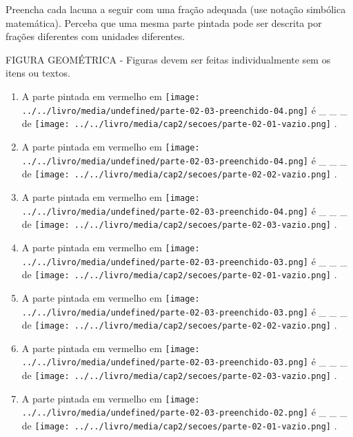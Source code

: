 \documentclass[a4,12pt]{book}
\begin{document}
Preencha cada lacuna a seguir com uma fração adequada (use notação simbólica matemática). Perceba que uma mesma parte pintada pode ser descrita por frações diferentes com unidades diferentes.
\begin{imagem*}[breakable]{}{}   FIGURA GEOMÉTRICA - Figuras devem ser feitas individualmente sem os itens ou textos.  
\end{imagem*}
\begin{enumerate} [\quad a)] %
  \item     A parte pintada em vermelho em         \texttt{[image: ../../livro/media/undefined/parte-02-03-preenchido-04.png]}     é \_ \_ \_   de         \texttt{[image: ../../livro/media/cap2/secoes/parte-02-01-vazio.png]}    .
  \item     A parte pintada em vermelho em         \texttt{[image: ../../livro/media/undefined/parte-02-03-preenchido-04.png]}     é \_ \_ \_   de         \texttt{[image: ../../livro/media/cap2/secoes/parte-02-02-vazio.png]}    .
  \item     A parte pintada em vermelho em         \texttt{[image: ../../livro/media/undefined/parte-02-03-preenchido-04.png]}     é \_ \_ \_   de         \texttt{[image: ../../livro/media/cap2/secoes/parte-02-03-vazio.png]}    .
  \item     A parte pintada em vermelho em         \texttt{[image: ../../livro/media/undefined/parte-02-03-preenchido-03.png]}     é \_ \_ \_   de         \texttt{[image: ../../livro/media/cap2/secoes/parte-02-01-vazio.png]}    .
  \item     A parte pintada em vermelho em         \texttt{[image: ../../livro/media/undefined/parte-02-03-preenchido-03.png]}     é \_ \_ \_   de         \texttt{[image: ../../livro/media/cap2/secoes/parte-02-02-vazio.png]}    .
  \item     A parte pintada em vermelho em         \texttt{[image: ../../livro/media/undefined/parte-02-03-preenchido-03.png]}     é \_ \_ \_   de         \texttt{[image: ../../livro/media/cap2/secoes/parte-02-03-vazio.png]}    .
  \item     A parte pintada em vermelho em         \texttt{[image: ../../livro/media/undefined/parte-02-03-preenchido-02.png]}     é \_ \_ \_   de         \texttt{[image: ../../livro/media/cap2/secoes/parte-02-01-vazio.png]}    .

\end{enumerate}
\end{document}
